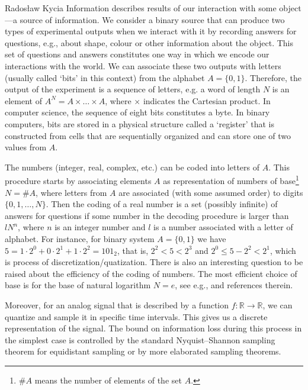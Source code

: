 \begin{artengenv}{Radosław Kycia}
Information describes results of our interaction with some object---a source of information. We consider a binary source that can produce two types of experimental outputs when we interact with it by recording answers for questions, e.g., about shape, colour or other information about the object. This set of questions and answers constitutes one way in which we encode our interactions with the world. We can associate these two outputs with letters (usually called `bits' in this context) from the alphabet $A=\{0,1\}$. Therefore, the output of the experiment is a sequence of letters, e.g. a word of length $N$ is an element of $A^N=A\times \ldots \times A$, where $\times$ indicates the Cartesian product. In computer science, the sequence of eight bits constitutes a byte. In binary computers, bits are stored in a physical structure called a `register' that is constructed from cells that are sequentially organized and can store one of two values from $A$. 

The numbers (integer, real, complex, etc.) can be coded into letters of $A$. This procedure starts by associating elements $A$ as representation of numbers of base\footnote{$\#A$ means the number of elements of the set $A$.} $N=\#A$, where letters from $A$ are associated (with some assumed order) to digits $\{0,1,\ldots, N\}$. Then the coding of a real number is a set (possibly infinite) of answers for questions if some number in the decoding procedure is larger than $lN^{n}$, where $n$ is an integer number and $l$ is a number associated with a letter of alphabet. For instance, for binary system $A=\{0,1\}$ we have  $5 = 1\cdot2^{0}+0\cdot 2^{1} + 1\cdot 2^{2} = 101_{2}$, that is, $2^{2} < 5 <2^{3}$ and $ 2^{0} \leq 5-2^{2} < 2^{1}$, which is process of discretization/quatization. There is also an interesting question to be raised about the efficiency of the coding of numbers. The most efficient choice of base is for the base of natural logarithm  $N=e$, see e.g., \parencites{kycia_information_2020}{KyciaNiemczynowicz} and references therein.

Moreover, for an analog signal that is described by a function $f:\mathbb{R}\rightarrow \mathbb{R}$, we can quantize and sample it in specific time intervals. This gives us a discrete representation of the signal. The bound on information loss during this process in the simplest case is controlled by the standard Nyquist--Shannon sampling theorem for equidistant sampling \parencite{Probing, RezaInformation} or by more elaborated sampling theorems.


\end{artengenv}
